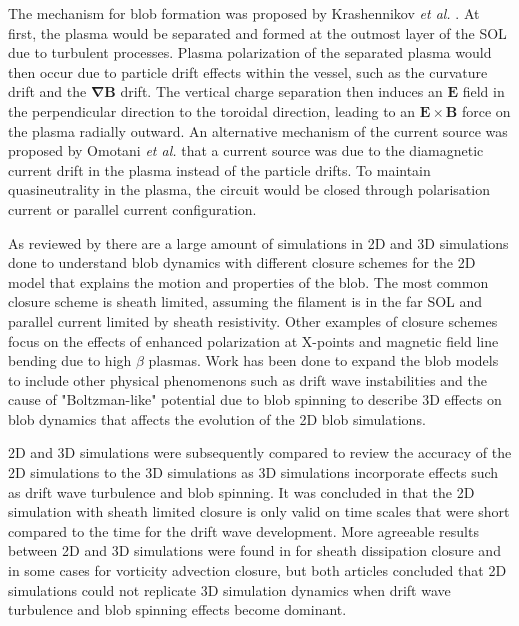 \documentclass{article}
\begin{document}
The mechanism for blob formation was proposed by Krashennikov \textit{et al.} \cite{krasheninnikov_recent_2008, krasheninnikov_scrape_2001}. At first, the plasma would be separated and formed at the outmost layer of the SOL due to turbulent processes. Plasma polarization of the separated plasma would then occur due to particle drift effects within the vessel, such as the curvature drift and the $\bm{\nabla B}$ drift. The vertical charge separation then induces an $\bm{E}$ field in the perpendicular direction to the toroidal direction, leading to an $\bm{E}\times\bm{B}$ force on the plasma radially outward. An alternative mechanism of the current source was proposed by Omotani \textit{et al.} that a current source was due to the diamagnetic current drift in the plasma instead of the particle drifts. To maintain quasineutrality in the plasma, the circuit would be closed through polarisation current or parallel current configuration.

As reviewed by \cite{dippolito_convective_2011} there are a large amount of simulations in 2D and 3D simulations done to understand blob dynamics with different closure schemes for the 2D model that explains the motion and properties of the blob. The most common closure scheme is sheath limited, assuming the filament is in the far SOL and parallel current limited by sheath resistivity. Other examples of closure schemes focus on the effects of enhanced polarization at X-points and magnetic field line bending due to high $\beta$ plasmas\cite{krasheninnikov_recent_2008}. Work has been done to expand the blob models to include other physical phenomenons such as drift wave instabilities \cite {angus_effect_2012} and the cause of "Boltzman-like" potential due to blob spinning \cite{angus_effects_2012} to describe 3D effects on blob dynamics that affects the evolution of the 2D blob simulations.

2D and 3D simulations were subsequently compared to review the accuracy of the 2D simulations to the 3D simulations as 3D simulations incorporate effects such as drift wave turbulence and blob spinning. It was concluded in \cite{angus_3d_2012}that the 2D simulation with sheath limited closure is only valid on time scales that were short compared to the time for the drift wave development. More agreeable results between 2D and 3D simulations were found in \cite{easy_three_2014} for sheath dissipation closure and in some cases for vorticity advection closure, but both articles concluded that 2D simulations could not replicate 3D simulation dynamics when drift wave turbulence and blob spinning effects become dominant.
\end{document}
